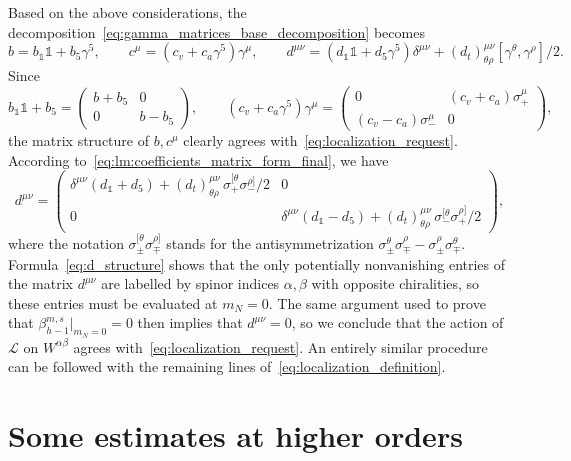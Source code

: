 \documentclass[a4paper, 11pt]{article}
\newcommand{\id}{\mathds{1}}								%
\newcommand{\loc}{\mathcal{L}}								%
\theoremstyle{thm}
\begin{document}
Based on the above considerations, the decomposition~\eqref{eq:gamma_matrices_base_decomposition} becomes
\begin{equation}
\label{eq:lm:coefficients_matrix_form_final}
b = b_\id \id + b_5 \gamma^5, \qquad c^\mu = (c_v + c_a \gamma^5) \gamma^\mu, \qquad d^{\mu \nu} = (d_\id \id + d_5 \gamma^5) \delta^{\mu \nu} + (d_t)^{\mu \nu}_{\theta \rho} [\gamma^\theta, \gamma^\rho]/2.
\end{equation}
Since
\begin{equation}
b_\id \id + b_5 =
\begin{pmatrix}
b + b_5	&	0	\\
0		&	b - b_5
\end{pmatrix},
\qquad
(c_v + c_a \gamma^5) \gamma^\mu =
\begin{pmatrix}
0								&	(c_v + c_a) \sigma^\mu_+ \\
(c_v - c_a) \sigma^\mu_-		&	0
\end{pmatrix},
\end{equation}
the matrix structure of $b, c^\mu$ clearly agrees with~\eqref{eq:localization_request}. According to~\eqref{eq:lm:coefficients_matrix_form_final}, we have
\begin{equation}
\label{eq:d_structure}
d^{\mu \nu} =
\begin{pmatrix}
\delta^{\mu \nu}(d_\id + d_5) + (d_t)^{\mu \nu}_{\theta \rho} \, \sigma_+^{[\theta} \sigma_-^{\rho]}/2	&	0 \\
0	&	\delta^{\mu \nu}(d_\id - d_5) + (d_t)^{\mu \nu}_{\theta \rho} \, \sigma_-^{[\theta} \sigma_+^{\rho]}/2
\end{pmatrix},
\end{equation} 
where the notation $\sigma_\pm^{[\theta} \sigma_\mp^{\rho]}$ stands for the antisymmetrization $\sigma_\pm^{\theta} \sigma_\mp^{\rho} -\sigma_\pm^{\rho} \sigma_\mp^{\theta}$. Formula~\eqref{eq:d_structure} shows that the only potentially nonvanishing entries of the matrix $d^{\mu \nu}$ are labelled by spinor indices $\alpha, \beta$ with opposite chiralities, so these entries must be evaluated at $m_N = 0$. The same argument used to prove that $\beta^{m, s}_{h-1} \vert_{m_N = 0} = 0$ then implies that $d^{\mu \nu} = 0$, so we conclude that the action of $\loc$ on $W^{\alpha \beta}$ agrees with~\eqref{eq:localization_request}. An entirely similar procedure can be followed with the remaining lines of~\eqref{eq:localization_definition}.

\section{Some estimates at higher orders}
\label{app:higher_orders_estimates}
\end{document}
